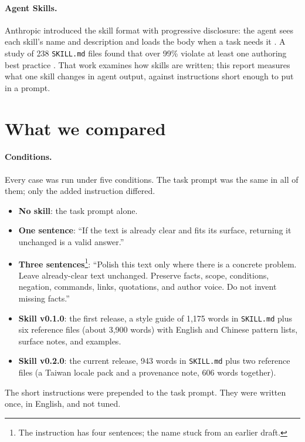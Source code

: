 \documentclass[11pt]{article}
\newcommand{\code}[1]{\texttt{#1}}
\begin{document}
\paragraph{Agent Skills.} Anthropic introduced the skill format with progressive
disclosure: the agent sees each skill's name and description and loads the body when a
task needs it \cite{zhang2025skills}. A study of 238 \code{SKILL.md} files found that over
99\% violate at least one authoring best practice \cite{hong2026skillsmells}. That work
examines how skills are written; this report measures what one skill changes in agent
output, against instructions short enough to put in a prompt.

\section{What we compared}

\paragraph{Conditions.} Every case was run under five conditions. The task prompt was the
same in all of them; only the added instruction differed.

\begin{itemize}
  \item \textbf{No skill}: the task prompt alone.
  \item \textbf{One sentence}: ``If the text is already clear and fits its surface,
    returning it unchanged is a valid answer.''
  \item \textbf{Three sentences}\footnote{The instruction has four sentences; the name
    stuck from an earlier draft.}: ``Polish this text only where there is a concrete
    problem. Leave already-clear text unchanged. Preserve facts, scope, conditions,
    negation, commands, links, quotations, and author voice. Do not invent missing
    facts.''
  \item \textbf{Skill v0.1.0}: the first release, a style guide of 1{,}175 words in
    \code{SKILL.md} plus six reference files (about 3{,}900 words) with English and
    Chinese pattern lists, surface notes, and examples.
  \item \textbf{Skill v0.2.0}: the current release, 943 words in \code{SKILL.md} plus two
    reference files (a Taiwan locale pack and a provenance note, 606 words together).
\end{itemize}

The short instructions were prepended to the task prompt. They were written once, in
English, and not tuned.
\end{document}
